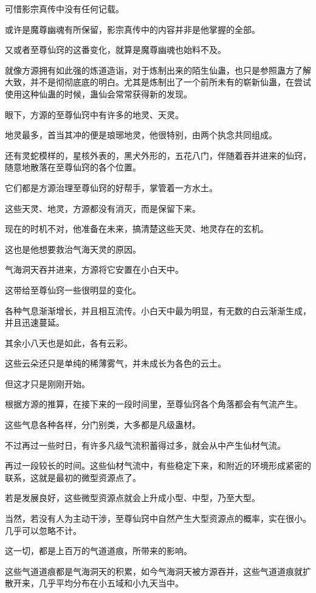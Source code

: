 \begin{this_body}
可惜影宗真传中没有任何记载。

或许是魔尊幽魂有所保留，影宗真传中的内容并非是他掌握的全部。

又或者至尊仙窍的这番变化，就算是魔尊幽魂也始料不及。

就像方源拥有如此强的炼道造诣，对于炼制出来的陌生仙蛊，也只是参照蛊方了解大致，并不是彻彻底底的明白。尤其是炼制出了一个前所未有的崭新仙蛊，在尝试使用这种仙蛊的时候，蛊仙会常常获得新的发现。

眼下，方源的至尊仙窍中有许多的地灵、天灵。

地灵最多，首当其冲的便是琅琊地灵，他很特别，由两个执念共同组成。

还有灵蛇模样的，星核外表的，黑犬外形的，五花八门，伴随着吞并进来的仙窍，随意地散落在至尊仙窍的各个位置。

它们都是方源治理至尊仙窍的好帮手，掌管着一方水土。

这些天灵、地灵，方源都没有消灭，而是保留下来。

现在的时机不对，他准备在未来，搞清楚这些天灵、地灵存在的玄机。

这也是他想要救治气海天灵的原因。

气海洞天吞并进来，方源将它安置在小白天中。

这带给至尊仙窍一些很明显的变化。

各种气息渐渐增长，并且相互流传。小白天中最为明显，有无数的白云渐渐生成，并且迅速蔓延。

其余小八天也是如此，各有云彩。

这些云朵还只是单纯的稀薄雾气，并未成长为各色的云土。

但这才只是刚刚开始。

根据方源的推算，在接下来的一段时间里，至尊仙窍各个角落都会有气流产生。

这些气息各种各样，分门别类，大多都是凡级蛊材。

不过再过一些时日，有许多凡级气流积蓄得过多，就会从中产生仙材气流。

再过一段较长的时间。这些仙材气流中，有些稳定下来，和附近的环境形成紧密的联系，这就是最初的微型资源点了。

若是发展良好，这些微型资源点就会上升成小型、中型，乃至大型。

当然，若没有人为主动干涉，至尊仙窍中自然产生大型资源点的概率，实在很小。几乎可以忽略不计。

这一切，都是上百万的气道道痕，所带来的影响。

这些气道道痕都是气海洞天的积累，如今气海洞天被方源吞并，这些气道道痕就扩散开来，几乎平均分布在小五域和小九天当中。


\end{this_body}
